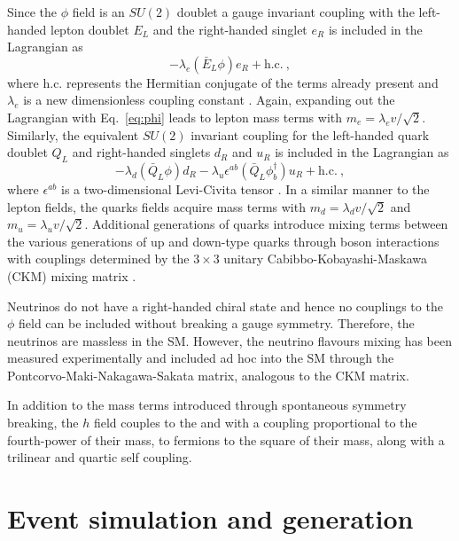 Since the $\phi$ field is an $SU(2)$ doublet a gauge invariant coupling with the left-handed lepton doublet $E_L$ and the right-handed singlet $e_R$ is included in the Lagrangian as
%
\begin{equation}
    -\lambda_e (\bar{E}_L \phi) e_R + \mathrm{h.c.}\ ,
\end{equation}
%
where h.c. represents the Hermitian conjugate of the terms already present and $\lambda_e$ is a new dimensionless coupling constant \cite{Peskin:1995ev}.  Again, expanding out the Lagrangian with Eq.~\ref{eq:phi} leads to lepton mass terms with $m_e = \lambda_e v/\sqrt{2}$. Similarly, the equivalent $SU(2)$ invariant coupling for the left-handed quark doublet $Q_L$ and right-handed singlets $d_R$ and $u_R$ is included in the Lagrangian as
%
\begin{equation}
    -\lambda_d (\bar{Q}_L\phi) d_R - \lambda_u \epsilon^{ab}(\bar{Q}_L\phi_b^{\dagger})u_R + \mathrm{h.c.}\ ,
\end{equation}
%
where $\epsilon^{ab}$ is a two-dimensional Levi-Civita tensor \cite{Peskin:1995ev}.  In a similar manner to the lepton fields, the quarks fields acquire mass terms with $m_d = \lambda_d v/\sqrt{2}$ and $m_u = \lambda_u v/\sqrt{2}$. Additional generations of quarks introduce mixing terms between the various generations of up and down-type quarks through \PW boson interactions with couplings determined by the $3\times 3$ unitary Cabibbo-Kobayashi-Maskawa (CKM) mixing matrix \cite{PhysRevLett.10.531,Kobayashi:1973fv}.

Neutrinos do not have a right-handed chiral state and hence no couplings to the $\phi$ field can be included without breaking a gauge symmetry. Therefore, the neutrinos are massless in the SM. However, the neutrino flavours mixing has been measured experimentally and included ad hoc into the SM through the Pontcorvo-Maki-Nakagawa-Sakata matrix\cite{Pontecorvo:1957qd,Maki:1962mu}, analogous to the CKM matrix.

In addition to the mass terms introduced through spontaneous symmetry breaking, the $h$ field couples to the \PW and \PZ with a coupling proportional to the fourth-power of their mass, to fermions to the square of their mass, along with a trilinear and quartic self coupling.


\section{Event simulation and generation}

